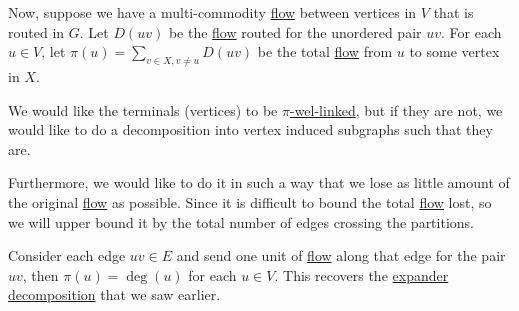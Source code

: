 Now, suppose we have a multi-commodity \hyperref[def:flow]{flow} between vertices in \(V\) that is routed in \(G\). Let \(D(uv)\) be the \hyperref[def:flow]{flow} routed for the unordered pair \(uv\). For each \(u \in V\), let \(\pi (u) = \sum_{v \in X, v \neq u} D(uv)\) be the total \hyperref[def:flow]{flow} from \(u\) to some vertex in \(X\).

\begin{intuition}
	We would like the terminals (vertices) to be \hyperref[def:weighted-well-linked]{\(\pi \)-wel-linked}, but if they are not, we would like to do a decomposition into vertex induced subgraphs such that they are.
\end{intuition}

Furthermore, we would like to do it in such a way that we lose as little amount of the original \hyperref[def:flow]{flow} as possible. Since it is difficult to bound the total \hyperref[def:flow]{flow} lost, so we will upper bound it by the total number of edges crossing the partitions.

\begin{note}
	Consider each edge \(uv \in E\) and send one unit of \hyperref[def:flow]{flow} along that edge for the pair \(uv\), then \(\pi (u) = \deg(u)\) for each \(u \in V\). This recovers the \hyperref[def:expander-decomposition]{expander decomposition} that we saw earlier.
\end{note}

